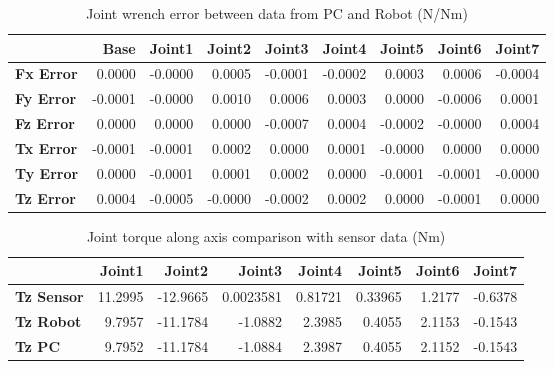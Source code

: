 \begin{table}[h!]
	\centering
	\caption{Joint wrench error between data from PC and Robot (N/Nm)}
	\label{wrech_Error_Pose6}
	\begin{tabular}{|l|r|r|r|r|r|r|r|r|}
		\hline
		\textbf{}  & \textbf{Base} & \textbf{Joint1}  & \textbf{Joint2}  & \textbf{Joint3}  & \textbf{Joint4}  & \textbf{Joint5}  & \textbf{Joint6}  & \textbf{Joint7} \\ \hline
		\textbf{Fx Error}  & 0.0000        & -0.0000        & 0.0005        & -0.0001        & -0.0002        & 0.0003        & 0.0006        & -0.0004 \\ \hline
		\textbf{Fy Error}  & -0.0001        & -0.0000        & 0.0010        & 0.0006        & 0.0003        & 0.0000        & -0.0006        & 0.0001 \\ \hline
		\textbf{Fz Error}  & 0.0000        & 0.0000        & 0.0000        & -0.0007        & 0.0004        & -0.0002        & -0.0000        & 0.0004 \\ \hline
		\textbf{Tx Error}  & -0.0001        & -0.0001        & 0.0002        & 0.0000        & 0.0001        & -0.0000        & 0.0000        & 0.0000 \\ \hline
		\textbf{Ty Error}  & 0.0000        & -0.0001        & 0.0001        & 0.0002        & 0.0000        & -0.0001        & -0.0001        & -0.0000 \\ \hline
		\textbf{Tz Error}  & 0.0004        & -0.0005        & -0.0000        & -0.0002        & 0.0002        & 0.0000        & -0.0001        & 0.0000 \\ \hline
	\end{tabular}
\end{table}

\begin{table}[h!]
	\centering
	\caption{Joint torque along axis comparison with sensor data (Nm)}
	\label{wrech_Sensor_Pose6}
	\begin{tabular}{|l|r|r|r|r|r|r|r|}
		\hline
		\textbf{} & \textbf{Joint1} & \textbf{Joint2} & \textbf{Joint3} & \textbf{Joint4} & \textbf{Joint5} & \textbf{Joint6} & \textbf{Joint7} \\ \hline
		\textbf{Tz Sensor}  & 11.2995           & -12.9665           & 0.0023581            & 0.81721           & 0.33965           & 1.2177           & -0.6378           \\ \hline
		\textbf{Tz Robot}  	& 9.7957           & -11.1784           & -1.0882            & 2.3985           & 0.4055           & 2.1153           & -0.1543           \\ \hline
		\textbf{Tz PC}  	& 9.7952           & -11.1784           & -1.0884            & 2.3987           & 0.4055           & 2.1152           & -0.1543           \\ \hline
	\end{tabular}
\end{table}

